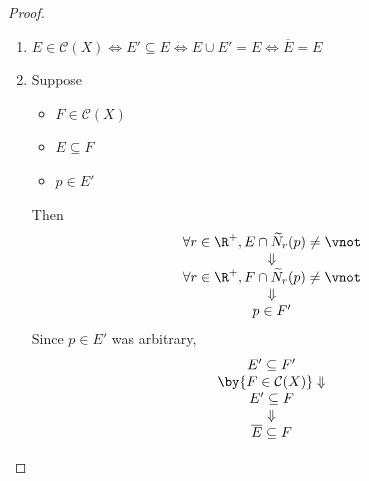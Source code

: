 \begin{proof}
\begin{enumerate}[label=\textbf{(\Alph*)}]
\[\begin{array}{c}
              p \in \paren*{\paren*{\overline{E}}^{c}}^{\circ}
            \end{array}
          \]
          Since $p \in \paren*{\overline{E}}^{c}$ was arbitrary,
          \[
            \begin{array}{c}
              \paren*{\overline{E}}^{c} \in \mathcal{O}(X)                    \\
              \by{\Cref{an1:thm:complement-of-open-set-is-closed}} \Downarrow \\
              \overline{E} \in \mathcal{C}(X)
            \end{array}
          \]
    \item $E \in \mathcal{C}(X) \iff E' \subseteq E \iff E \cup E' = E \iff \overline{E} = E$
    \item Suppose
          \begin{itemize}
            \item $F \in \mathcal{C}(X)$
            \item $E \subseteq F$
            \item $p \in E'$
          \end{itemize}
          Then
          \[
            \begin{array}{c}
              \forall r \in \R^{+}, E \cap \widetilde{N}_{r}(p) \neq \vnot \\
              \Downarrow                                                   \\
              \forall r \in \R^{+}, F \cap \widetilde{N}_{r}(p) \neq \vnot \\
              \Downarrow                                                   \\
              p \in F'
            \end{array}
          \]
          Since $p \in E'$ was arbitrary,
          \[
            \begin{array}{c}
              E' \subseteq F'                                   \\
              \by{\ensuremath{F \in \mathcal{C}(X)}} \Downarrow \\
              E' \subseteq F                                    \\
              \Downarrow                                        \\
              \overline{E} \subseteq F
            \end{array}
          \]
  \end{enumerate}
\end{proof}

